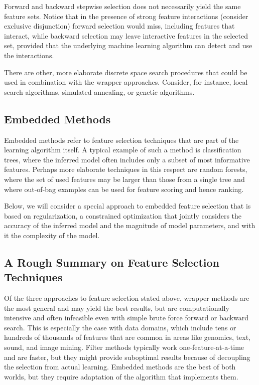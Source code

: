 \begin{refsection}
Forward and backward stepwise selection does not necessarily yield the same feature sets. Notice that in the presence of strong feature interactions (\eg consider exclusive disjunction) forward selection would miss, including features that interact, while backward selection may leave interactive features in the selected set, provided that the underlying machine learning algorithm can detect and use the interactions.

There are other, more elaborate discrete space search procedures that could be used in combination with the wrapper approaches. Consider, for instance, local search algorithms, simulated annealing, or genetic algorithms.

\subsection*{Embedded Methods}

Embedded methods refer to feature selection techniques that are part of the learning algorithm itself. A typical example of such a method is classification trees, where the inferred model often includes only a subset of most informative features. Perhaps more elaborate techniques in this respect are random forests, where the set of used features may be larger than those from a single tree and where out-of-bag examples can be used for feature scoring and hence ranking. 

Below, we will consider a special approach to embedded feature selection that is based on regularization, a constrained optimization that jointly considers the accuracy of the inferred model and the magnitude of model parameters, and with it the complexity of the model.

\subsection*{A Rough Summary on Feature Selection Techniques}

Of the three approaches to feature selection stated above, wrapper methods are the most general and may yield the best results, but are computationally intensive and often infeasible even with simple brute force forward or backward search. This is especially the case with data domains, which include tens or hundreds of thousands of features that are common in areas like genomics, text, sound, and image mining. Filter methods typically work one-feature-at-a-time and are faster, but they might provide suboptimal results because of decoupling the selection from actual learning. Embedded methods are the best of both worlds, but they require adaptation of the algorithm that implements them.


\end{refsection}
